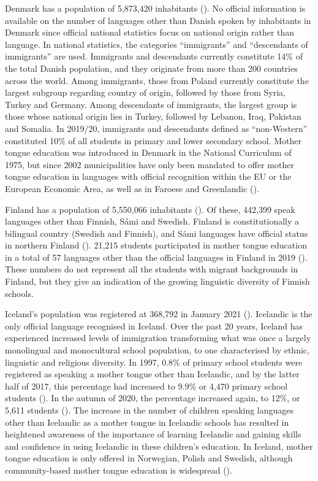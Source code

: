 \documentclass[output=paper]{langscibook}
\begin{document}
Denmark has a population of 5,873,420 inhabitants (\citealt{Statistics_denmark2023}). No official information is available on the number of languages other than Danish spoken by inhabitants in Denmark since official national statistics focus on national origin rather than language. In national statistics, the categories “immigrants” and “descendants of immigrants” are used. Immigrants and descendants currently constitute 14\% of the total Danish population, and they originate from more than 200 countries across the world. Among immigrants, those from Poland currently constitute the largest subgroup regarding country of origin, followed by those from Syria, Turkey and Germany. Among descendants of immigrants, the largest group is those whose national origin lies in Turkey, followed by Lebanon, Iraq, Pakistan and Somalia. In 2019/20, immigrants and descendants defined as “non-Western” constituted 10\% of all students in primary and lower secondary school. Mother tongue education was introduced in Denmark in the National Curriculum of 1975, but since 2002 municipalities have only been mandated to offer mother tongue education in languages with official recognition within the EU or the European Economic Area, as well as in Faroese and Greenlandic (\citealt{AlisaariEtAl2023}).

Finland has a population of 5,550,066 inhabitants (\citealt{Statistics_finland2023}). Of these, 442,399 speak languages other than Finnish, Sámi and Swedish. Finland is constitutionally a bilingual country (Swedish and Finnish), and Sámi languages have official status in northern Finland (\citealt[55]{AlisaariEtAl2023}). 21,215 students participated in mother tongue education in a total of 57 languages other than the official languages in Finland in 2019 (\citealt{Finnish_national_agency_for_education2022}). These numbers do not represent all the students with migrant backgrounds in Finland, but they give an indication of the growing linguistic diversity of Finnish schools.

Iceland’s population was registered at 368,792 in January 2021 (\citealt{Statistics_iceland2022}). Icelandic is the only official language recognised in Iceland. Over the past 20 years, Iceland has experienced increased levels of immigration transforming what was once a largely monolingual and monocultural school population, to one characterised by ethnic, linguistic and religious diversity. In 1997, 0.8\% of primary school students were registered as speaking a mother tongue other than Icelandic, and by the latter half of 2017, this percentage had increased to 9.9\% or 4,470 primary school students (\citealt{Statistics_iceland2018}). In the autumn of 2020, the percentage increased again, to 12\%, or 5,611 students (\citealt{Statistics_iceland2020-children}). The increase in the number of children speaking languages other than Icelandic as a mother tongue in Icelandic schools has resulted in heightened awareness of the importance of learning Icelandic and gaining skills and confidence in using Icelandic in these children’s education. In Iceland, mother tongue education is only offered in Norwegian, Polish and Swedish, although community-based mother tongue education is widespread (\citealt{PeskovaEtAl2023}).
\end{document}
